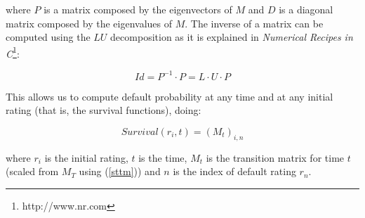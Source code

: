 \documentclass[a4paper,12pt,final]{article}
\begin{document}
where $P$ is a matrix composed by the eigenvectors of $M$ and $D$ is a diagonal 
matrix composed by the eigenvalues of $M$. The inverse of a matrix can be 
computed using the $LU$ decomposition as it is explained in \emph{Numerical 
Recipes in C}\footnote{http://www.nr.com}:

\begin{displaymath}
Id = P^{-1} \cdot P = L \cdot U \cdot P
\end{displaymath}

This allows us to compute default probability at any time and at any initial 
rating (that is, the survival functions), doing:

\begin{displaymath}
Survival(r_i, t) = \left( M_t \right)_{i, n}
\end{displaymath}

where $r_i$ is the initial rating, $t$ is the time, $M_t$ is the transition 
matrix for time $t$ (scaled from $M_T$ using (\ref{sttm})) and $n$ is the 
index of default rating $r_n$.


\newpage


\end{document}
